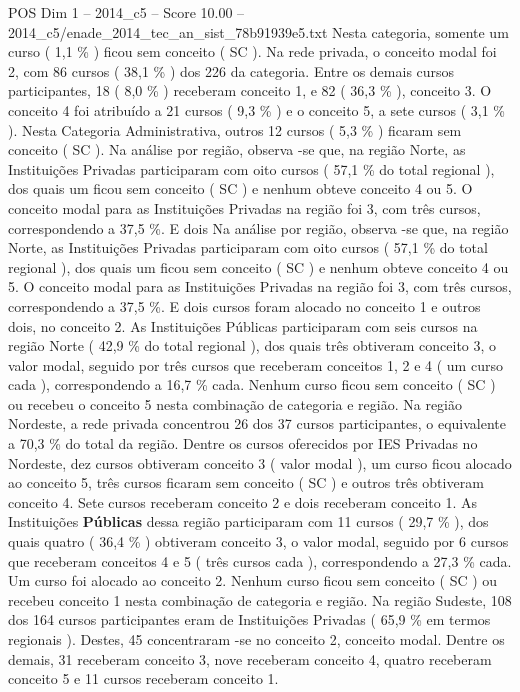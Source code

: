 \begin{textsample}{POS Dim 1 – 2014\_c5 – Score 10.00 – 2014\_c5/enade\_2014\_tec\_an\_sist\_78b91939e5.txt}
Nesta categoria, somente um curso ( 1,1 \% ) ficou sem conceito ( SC ).
Na rede privada, o conceito modal foi 2, com 86 cursos ( 38,1 \% ) dos 226 da categoria.
Entre os demais cursos participantes, 18 ( 8,0 \% ) receberam conceito 1, e 82 ( 36,3 \% ), conceito 3.
O conceito 4 foi atribuído a 21 cursos ( 9,3 \% ) e o conceito 5, a sete cursos ( 3,1 \% ).
Nesta Categoria Administrativa, outros 12 cursos ( 5,3 \% ) ficaram sem conceito ( SC ).
Na análise por região, observa -se que, na região Norte, as Instituições Privadas participaram com oito cursos ( 57,1 \% do total regional ), dos quais um ficou sem conceito ( SC ) e nenhum obteve conceito 4 ou 5.
O conceito modal para as Instituições Privadas na região foi 3, com três cursos, correspondendo a 37,5 \%.
E dois Na análise por região, observa -se que, na região Norte, as Instituições Privadas participaram com oito cursos ( 57,1 \% do total regional ), dos quais um ficou sem conceito ( SC ) e nenhum obteve conceito 4 ou 5.
O conceito modal para as Instituições Privadas na região foi 3, com três cursos, correspondendo a 37,5 \%.
E dois cursos foram alocado no conceito 1 e outros dois, no conceito 2.
As Instituições Públicas participaram com seis cursos na região Norte ( 42,9 \% do total regional ), dos quais três obtiveram conceito 3, o valor modal, seguido por três cursos que receberam conceitos 1, 2 e 4 ( um curso cada ), correspondendo a 16,7 \% cada.
Nenhum curso ficou sem conceito ( SC ) ou recebeu o conceito 5 nesta combinação de categoria e região.
Na região Nordeste, a rede privada concentrou 26 dos 37 cursos participantes, o equivalente a 70,3 \% do total da região.
Dentre os cursos oferecidos por IES Privadas no Nordeste, dez cursos obtiveram conceito 3 ( valor modal ), um curso ficou alocado ao conceito 5, três cursos ficaram sem conceito ( SC ) e outros três obtiveram conceito 4.
Sete cursos receberam conceito 2 e dois receberam conceito 1.
As Instituições \textbf{Públicas} dessa região participaram com 11 cursos ( 29,7 \% ), dos quais quatro ( 36,4 \% ) obtiveram conceito 3, o valor modal, seguido por 6 cursos que receberam conceitos 4 e 5 ( três cursos cada ), correspondendo a 27,3 \% cada.
Um curso foi alocado ao conceito 2.
Nenhum curso ficou sem conceito ( SC ) ou recebeu conceito 1 nesta combinação de categoria e região.
Na região Sudeste, 108 dos 164 cursos participantes eram de Instituições Privadas ( 65,9 \% em termos regionais ).
Destes, 45 concentraram -se no conceito 2, conceito modal.
Dentre os demais, 31 receberam conceito 3, nove receberam conceito 4, quatro receberam conceito 5 e 11 cursos receberam conceito 1.

\end{textsample}
